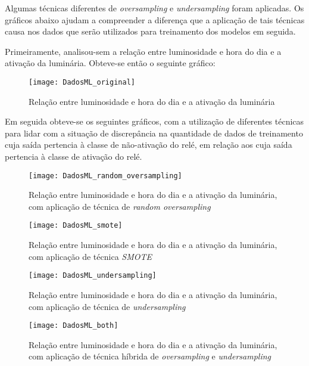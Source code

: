 			Algumas técnicas diferentes de \emph{oversampling} e \emph{undersampling} foram aplicadas. Os gráficos abaixo ajudam a compreender a diferença que a aplicação de tais técnicas causa nos dados que serão utilizados para treinamento dos modelos em seguida.

			Primeiramente, analisou-sem a relação entre luminosidade e hora do dia e a ativação da luminária. Obteve-se então o seguinte gráfico:

			\begin{figure}[H]
				\centering
				\caption{Relação entre luminosidade e hora do dia e a ativação da luminária}
				\texttt{[image: DadosML\_original]}
				\label{fig:DadosML_original}
			\end{figure}

			Em seguida obteve-se os seguintes gráficos, com a utilização de diferentes técnicas para lidar com a situação de discrepância na quantidade de dados de treinamento cuja saída pertencia à classe de não-ativação do relé, em relação aos cuja saída pertencia à classe de ativação do relé.

			\begin{figure}[H]
				\centering
				\caption{Relação entre luminosidade e hora do dia e a ativação da luminária, com aplicação de técnica de \emph{random oversampling}}
				\texttt{[image: DadosML\_random\_oversampling]}
				\label{fig:DadosML_random_oversampling}
			\end{figure}

			\begin{figure}[H]
				\centering
				\caption{Relação entre luminosidade e hora do dia e a ativação da luminária, com aplicação de técnica \emph{SMOTE}}
				\texttt{[image: DadosML\_smote]}
				\label{fig:DadosML_smote}
			\end{figure}

			\begin{figure}[H]
				\centering
				\caption{Relação entre luminosidade e hora do dia e a ativação da luminária, com aplicação de técnica de \emph{undersampling}}
				\texttt{[image: DadosML\_undersampling]}
				\label{fig:DadosML_undersampling}
			\end{figure}

			\begin{figure}[H]
				\centering
				\caption{Relação entre luminosidade e hora do dia e a ativação da luminária, com aplicação de técnica híbrida de \emph{oversampling} e \emph{undersampling}}
				\texttt{[image: DadosML\_both]}
				\label{fig:DadosML_both}
			\end{figure}

